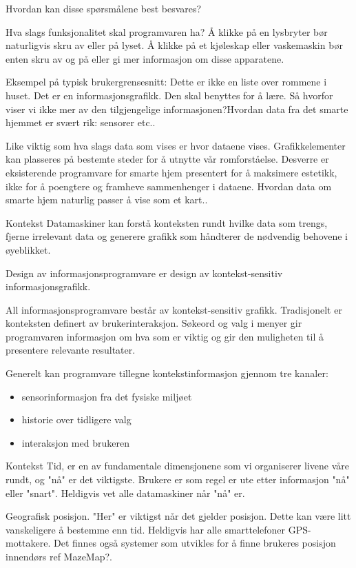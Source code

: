 Hvordan kan disse spørsmålene best besvares?

Hva slags funksjonalitet skal programvaren ha? Å klikke på en lysbryter bør naturligvis skru av eller på lyset. Å klikke på et kjøleskap eller vaskemaskin bør enten skru av og på eller gi mer informasjon om disse apparatene.

Eksempel på typisk brukergrensesnitt:
Dette er ikke en liste over rommene i huset. Det er en informasjonsgrafikk. Den skal benyttes for å lære. Så hvorfor viser vi ikke mer av den tilgjengelige informasjonen?{\color{red}Hvordan data fra det smarte hjemmet er svært rik: sensorer etc..}

Like viktig som hva slags data som vises er hvor dataene vises. Grafikkelementer kan plasseres på bestemte steder for å utnytte vår romforståelse. Desverre er eksisterende programvare for smarte hjem presentert for å maksimere estetikk, ikke for å poengtere og framheve sammenhenger i dataene. {\color{red}Hvordan data om smarte hjem naturlig passer å vise som et kart..}

Kontekst
Datamaskiner kan forstå konteksten rundt hvilke data som trengs, fjerne irrelevant data og generere grafikk som håndterer de nødvendig behovene i øyeblikket.

Design av informasjonsprogramvare er design av kontekst-sensitiv informasjonsgrafikk.

All informasjonsprogramvare består av kontekst-sensitiv grafikk. Tradisjonelt er konteksten definert av brukerinteraksjon. Søkeord og valg i menyer gir programvaren informasjon om hva som er viktig og gir den muligheten til å presentere relevante resultater.

Generelt kan programvare tillegne kontekstinformasjon gjennom tre kanaler:
\begin{itemize}
\item sensorinformasjon fra det fysiske miljøet
\item historie over tidligere valg
\item interaksjon med brukeren
\end{itemize}

Kontekst
Tid, er en av fundamentale dimensjonene som vi organiserer livene våre rundt, og "nå" er det viktigste. Brukere er som regel er ute etter informasjon "nå" eller "snart". Heldigvis vet alle datamaskiner når "nå" er.

Geografisk posisjon. "Her" er viktigst når det gjelder posisjon. Dette kan være litt vanskeligere å bestemme enn tid. Heldigvis har alle smarttelefoner GPS-mottakere. Det finnes også systemer som utvikles for å finne brukeres posisjon innendørs {\color{red}ref MazeMap?}.

